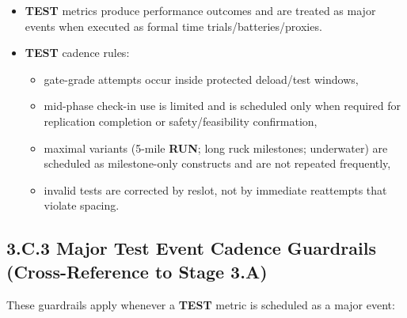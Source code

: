\documentclass[10pt]{article}
\begin{document}
\begin{itemize}
\item \textbf{TEST} metrics produce performance outcomes and are treated as major events when executed as formal time trials/batteries/proxies.
\item \textbf{TEST} cadence rules:
  \begin{itemize}
  \item gate-grade attempts occur inside protected deload/test windows,
  \item mid-phase check-in use is limited and is scheduled only when required for replication completion or safety/feasibility confirmation,
  \item maximal variants (5-mile \textbf{RUN}; long ruck milestones; underwater) are scheduled as milestone-only constructs and are not repeated frequently,
  \item invalid tests are corrected by reslot, not by immediate reattempts that violate spacing.
  \end{itemize}
\end{itemize}

\subsection*{3.C.3 Major Test Event Cadence Guardrails (Cross-Reference to Stage 3.A)}
{}

These guardrails apply whenever a \textbf{TEST} metric is scheduled as a major event:
\end{document}
